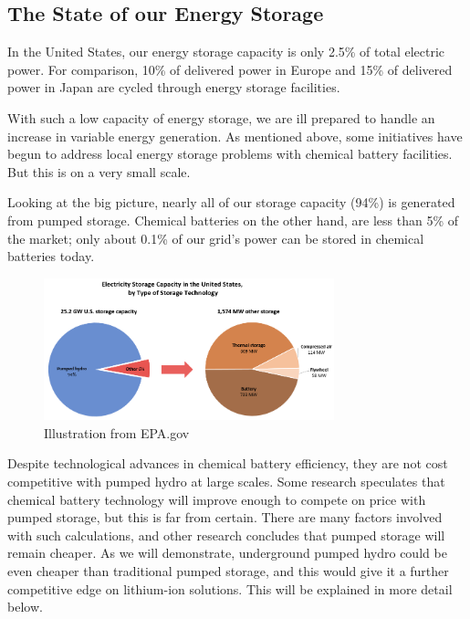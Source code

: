 \documentclass[hidelinks,12pt,a4paper]{article}
\begin{document}
\subsection{The State of our Energy Storage}
In the United States, our energy storage capacity is only 2.5\% of total electric power. For comparison, 10\% of delivered power in Europe and 15\% of delivered power in Japan are cycled through energy storage facilities. \cite{USGridEnergyStorageFactsheet}

With such a low capacity of energy storage, we are ill prepared to handle an increase in variable energy generation. As mentioned above, some initiatives have begun to address local energy storage problems with chemical battery facilities. But this is on a very small scale.

Looking at the big picture, nearly all of our storage capacity (94\%) is generated from pumped storage. \cite{ElectricStorageCapacityInTheUnitedStates} Chemical batteries on the other hand, are less than 5\% of the market; only about 0.1\% of our grid's power can be stored in chemical batteries today.

\begin{figure}[ht!]
    \centering
    \includegraphics[width=0.75\textwidth]{energy-storage-pie-charts.png}
    \caption{Illustration from EPA.gov \cite{ElectricStorageCapacityInTheUnitedStates}}
\end{figure}
\FloatBarrier

Despite technological advances in chemical battery efficiency, they are not cost competitive with pumped hydro at large scales. Some research speculates that chemical battery technology will improve enough to compete on price with pumped storage\cite{ProjectingTheFutureLevelizedCostOfElectricityStorageTechnologies}, but this is far from certain. There are many factors involved with such calculations, and other research concludes that pumped storage will remain cheaper. \cite{PumpedEnergyStorageVitalToCalifornia} As we will demonstrate, underground pumped hydro could be even cheaper than traditional pumped storage, and this would give it a further competitive edge on lithium-ion solutions. This will be explained in more detail below.
\end{document}
